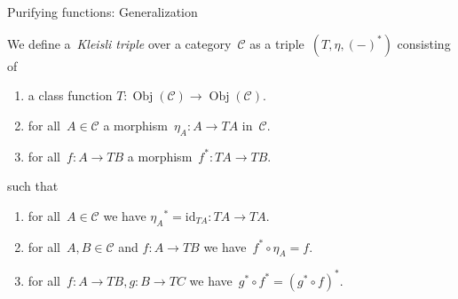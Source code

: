 \documentclass[notes]{beamer}
\newcommand{\cat}[1]{\mathcal{#1}}
\newcommand{\id}{\mathrm{id}}
\DeclareMathOperator{\Obj}{Obj}
\begin{document}
\begin{frame}{Purifying functions: Generalization}
    \begin{definition}
        We define a~\emph{Kleisli triple} over a category~\(\cat{C}\) as a
        triple~\((T,\eta,(-)^{\ast})\) consisting of
        \begin{enumerate}
            \item a class function
                \(T:\Obj(\cat{C})\longrightarrow\Obj(\cat{C})\).

            \item for all~\(A\in\cat{C}\)
                a morphism~\(\eta_{A}:A\longrightarrow TA\)
                in~\(\cat{C}\).

            \item for all~\(f:A\longrightarrow TB\) a
                morphism~\(f^{\ast}:TA\longrightarrow TB\).
        \end{enumerate}
        such that
        \begin{enumerate}
            \item for all~\(A\in\cat{C}\) we have
                \({\eta_{A}}^{\ast} = \id_{TA}:TA\longrightarrow TA\).

            \item for all~\(A,B\in\cat{C}\) and \(f:A\longrightarrow TB\) we
                have~\(f^{\ast}\circ\eta_{A} = f\).

            \item for all~\(f:A\to TB,g:B\to TC\) we
                have~\(g^{\ast}\circ f^{\ast} = (g^{\ast}\circ f)^{\ast}\).
        \end{enumerate}
    \end{definition}
\end{frame}
\end{document}
